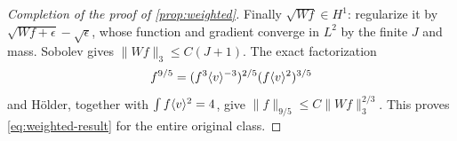 \begin{proof}[Completion of the proof of \cref{prop:weighted}]
Finally $\sqrt{Wf}\in H^1$: regularize it by $\sqrt{Wf+\epsilon}-\sqrt\epsilon$, whose function and gradient converge in $L^2$ by the finite $J$ and mass. Sobolev gives $\|Wf\|_3\le C(J+1)$. The exact factorization
\[
 f^{9/5}=(f^3\langle v\rangle^{-3})^{2/5}(f\langle v\rangle^2)^{3/5}
\]
and H\"older, together with $\int f\langle v\rangle^2=4$, give $\|f\|_{9/5}\le C\|Wf\|_3^{2/3}$. This proves \eqref{eq:weighted-result} for the entire original class.
\end{proof}
